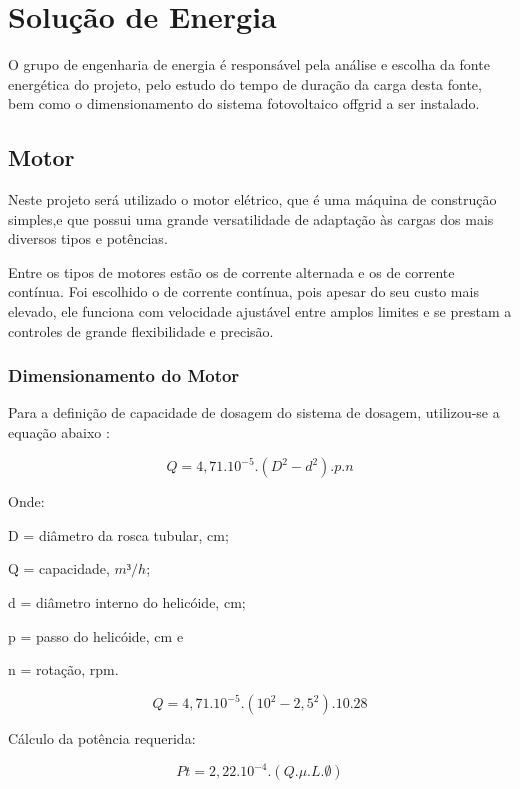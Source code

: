 \section{Solução de Energia}
O grupo de engenharia de energia é responsável pela análise e escolha da fonte energética do projeto, pelo estudo do tempo de duração da carga desta fonte, bem como o dimensionamento do sistema fotovoltaico offgrid a ser instalado.


\subsection{Motor}
Neste projeto será utilizado o motor elétrico, que é uma máquina de construção simples,e que possui uma grande versatilidade de adaptação às cargas dos mais diversos tipos e potências.

Entre os tipos de motores estão os de corrente alternada e os de corrente contínua. Foi escolhido o de corrente contínua, pois apesar do seu custo mais elevado, ele funciona com velocidade ajustável entre amplos limites e se prestam a controles de grande flexibilidade e precisão.

\subsubsection{Dimensionamento do Motor}

Para a definição de capacidade de dosagem do sistema de dosagem, utilizou-se a equação abaixo \cite{agricola}:

\begin{equation}
Q=4,71.10^{-5}.(D^{2}-d^{2}).p.n
\end{equation}

Onde:


D = diâmetro da rosca tubular, cm;

Q = capacidade, $m³/h$;

d = diâmetro interno do helicóide, cm;

p = passo do helicóide, cm e

n = rotação, rpm.

\begin{equation}
Q=4,71.10^{-5}.(10^{2}-2,5^{2}).10.28
\end{equation}

Cálculo da potência requerida:

\begin{equation}
Pt = 2,22.10^{-4}.(Q.\mu.L.\emptyset)
\end{equation}

